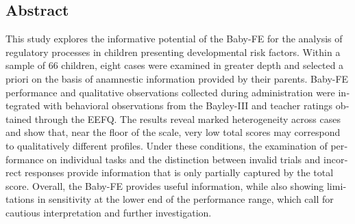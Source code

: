 \begin{otherlanguage}{english}
\cleardoublepage
\chapter*{Abstract}
\vspace*{\dimexpr 3\baselineskip - 3.2pt\relax}
\thispagestyle{plain}

\setlength{\parskip}{1em}

This study explores the informative potential of the Baby-FE for the analysis of regulatory processes in children presenting developmental risk factors. Within a sample of 66 children, eight cases were examined in greater depth and selected a priori on the basis of anamnestic information provided by their parents. Baby-FE performance and qualitative observations collected during administration were integrated with behavioral observations from the Bayley-III and teacher ratings obtained through the EEFQ. The results reveal marked heterogeneity across cases and show that, near the floor of the scale, very low total scores may correspond to qualitatively different profiles. Under these conditions, the examination of performance on individual tasks and the distinction between invalid trials and incorrect responses provide information that is only partially captured by the total score. Overall, the Baby-FE provides useful information, while also showing limitations in sensitivity at the lower end of the performance range, which call for cautious interpretation and further investigation.

\setlength{\parskip}{0em}
\end{otherlanguage}
